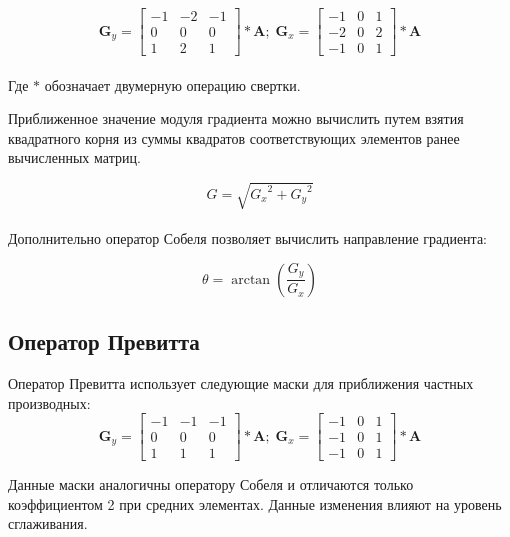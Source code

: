 \begin{equation}
\mathbf{G}_y =
\begin{bmatrix}
    -1 & -2 & -1\\
    0 & 0 & 0 \\
    1 & 2 & 1    
\end{bmatrix}
\ast \mathbf{A}
;\;
\mathbf{G}_x =
\begin{bmatrix}
    -1 & 0 & 1\\
    -2 & 0 & 2 \\
    -1 & 0 & 1 
\end{bmatrix}
\ast \mathbf{A}
\end{equation}
\\
Где $\ast$ обозначает двумерную операцию свертки.

Приближенное значение модуля градиента можно вычислить путем взятия квадратного корня из суммы квадратов соответствующих элементов ранее вычисленных матриц.

\begin{equation}
G = \sqrt{{G_x}^2 + {G_y}^2}
\end{equation}\\

Дополнительно оператор Собеля позволяет вычислить направление градиента:

\begin{equation}
\theta = \arctan \left( \frac{G_y}{G_x} \right)  
\end{equation}
\subsection{Оператор Превитта}
Оператор Превитта использует следующие маски для приближения частных производных:
\begin{equation}\label{eq:prewitt}
\mathbf{G}_y =
\begin{bmatrix}
-1 & -1 & -1\\
0 & 0 & 0 \\
1 & 1 & 1    
\end{bmatrix}
\ast \mathbf{A}
;\;
\mathbf{G}_x =
\begin{bmatrix}
-1 & 0 & 1\\
-1 & 0 & 1 \\
-1 & 0 & 1 
\end{bmatrix}
\ast \mathbf{A}
\end{equation}

Данные маски аналогичны оператору Собеля и отличаются только коэффициентом 2 при средних элементах. Данные изменения влияют на уровень сглаживания.
